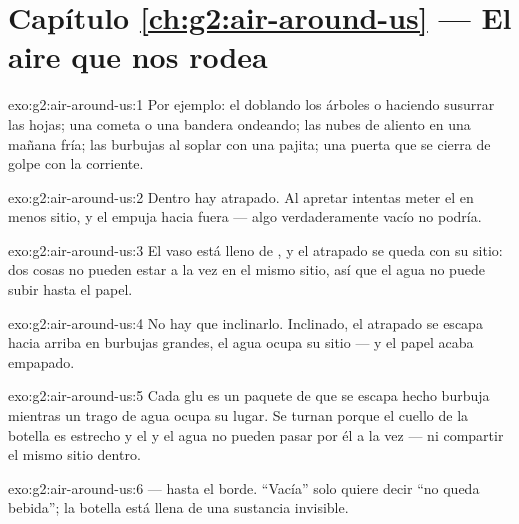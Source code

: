 \section*{Capítulo \ref{ch:g2:air-around-us} --- El aire que nos rodea}

\begin{solution}{exo:g2:air-around-us:1}
Por ejemplo: el  doblando los árboles o haciendo susurrar las
hojas; una cometa o una bandera ondeando; las nubes de aliento en una
mañana fría; las burbujas al soplar con una pajita; una puerta que se
cierra de golpe con la corriente.
\end{solution}

\begin{solution}{exo:g2:air-around-us:2}
Dentro hay  atrapado. Al apretar intentas meter el  en menos
sitio, y el  empuja hacia fuera --- algo verdaderamente vacío no
podría.
\end{solution}

\begin{solution}{exo:g2:air-around-us:3}
El vaso está lleno de , y el  atrapado se queda con su
sitio: dos cosas no pueden estar a la vez en el mismo sitio, así que
el agua no puede subir hasta el papel.
\end{solution}

\begin{solution}{exo:g2:air-around-us:4}
No hay que inclinarlo. Inclinado, el  atrapado se escapa hacia
arriba en burbujas grandes, el agua ocupa su sitio --- y el papel
acaba empapado.
\end{solution}

\begin{solution}{exo:g2:air-around-us:5}
Cada glu es un paquete de  que se escapa hecho burbuja mientras
un trago de agua ocupa su lugar. Se turnan porque el cuello de la
botella es estrecho y el  y el agua no pueden pasar por él a la
vez --- ni compartir el mismo sitio dentro.
\end{solution}

\begin{solution}{exo:g2:air-around-us:6}
 --- hasta el borde. ``Vacía'' solo quiere decir ``no queda
bebida''; la botella está llena de una sustancia invisible.
\end{solution}

